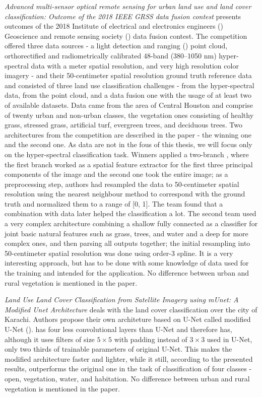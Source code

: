 \textit{Advanced multi-sensor optical remote sensing for urban land use and land cover classification: Outcome of the 2018 IEEE GRSS data fusion contest} presents outcomes of the 2018 Institute of electrical and electronics engineers () Geoscience and remote sensing society () data fusion contest. The competition offered three data sources - a light detection and ranging () point cloud, orthorectified and radiometrically calibrated 48-band (380--1050 nm) hyper-spectral data with a meter spatial resolution, and very high resolution color imagery - and their 50-centimeter spatial resolution ground truth reference data and consisted of three land use classification challenges - from the hyper-spectral data, from the point cloud, and a data fusion one with the usage of at least two of available datasets. Data came from the area of Central Houston and comprise of twenty urban and non-urban classes, the vegetation ones consisting of healthy grass, stressed grass, artificial turf, evergreen trees, and deciduous trees. Two architectures from the competition are described in the paper - the winning one and the second one. As  data are not in the fous of this thesis, we will focus only on the hyper-spectral classification task. Winners applied a two-branch , where the first branch worked as a spatial feature extractor for the first three principal components of the image and the second one took the entire image; as a preprocessing step, authors had resampled the data to 50-centimeter spatial resolution using the nearest neighbour method to correspond with the ground truth and normalized them to a range of [0, 1]. The team found that a combination with  data later helped the classification a lot. The second team used a very complex architecture combining a shallow fully connected  as a classifier for joint basic natural features such as grass, trees, and water and a deep  for more complex ones, and then parsing all outputs together; the initial resampling into 50-centimeter spatial resolution was done using order-3 spline. It is a very interesting approach, but has to be done with some knowledge of data used for the training and intended for the application. No difference between urban and rural vegetation is mentioned in the paper.

\textit{Land Use Land Cover Classification from Satellite Imagery using mUnet: A Modified Unet Architecture} deals with the land cover classification over the city of Karachi. Authors propose their own architeture based on U-Net \cite{u-net} called modified U-Net ().  has four less convolutional layers than U-Net and therefore has, although it uses filters of size $5 \times 5$ with padding instead of $3 \times 3$ used in U-Net, only two thirds of trainable parameters of original U-Net. This makes the modified architecture faster and lighter, while it still, according to the presented results, outperforms the original one in the task of classification of four classes - open, vegetation, water, and habitation. No difference between urban and rural vegetation is mentioned in the paper.

